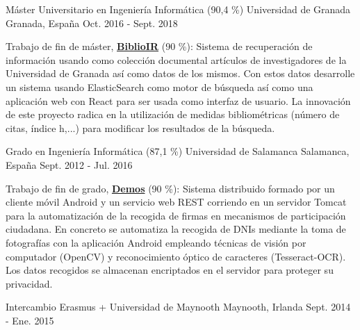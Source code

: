


\begin{cventries}


\cventry
{Máster Universitario en Ingeniería Informática (90,4 \%)} %
{Universidad de Granada} %
{Granada, España} %
{Oct. 2016 - Sept. 2018} %
{
\begin{cvitems}
	\item {Trabajo de fin de máster, \href{https://github.com/AythaE/TFM}{\textbf{BiblioIR}} (90 \%): Sistema de recuperación de información usando como colección documental artículos de investigadores de la Universidad de Granada así como datos de los mismos. Con estos datos desarrolle un sistema usando ElasticSearch como motor de búsqueda así como una aplicación web con React para ser usada como interfaz de usuario. La innovación de este proyecto radica en la utilización de medidas bibliométricas (número de citas, índice h,...) para modificar los resultados de la búsqueda. }
\end{cvitems}
 }

\cventry
{Grado en Ingeniería Informática (87,1 \%)} %
{Universidad de Salamanca} %
{Salamanca, España} %
{Sept. 2012 - Jul. 2016} %
{ %
\begin{cvitems}
	\item {Trabajo de fin de grado, \href{https://github.com/AythaE/Demos_Rest}{\textbf{Demos}} (90 \%): Sistema distribuido formado por un cliente móvil Android y un servicio web REST corriendo en un servidor Tomcat para la automatización de la recogida de firmas en mecanismos de participación ciudadana. En concreto se automatiza la recogida de DNIs mediante la toma de fotografías con la aplicación Android empleando técnicas de visión por computador (OpenCV) y reconocimiento óptico de caracteres (Tesseract-OCR). Los datos recogidos se almacenan encriptados en el servidor para proteger su privacidad. \\}
\end{cvitems}
}	

\cventry
{Intercambio Erasmus +} %
{Universidad de Maynooth} %
{Maynooth, Irlanda} %
{Sept. 2014 - Ene. 2015} %
{ }
\end{cventries}